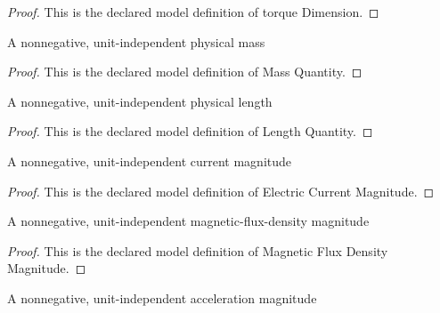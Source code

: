 \begin{proof}
  This is the declared model definition of torque Dimension.
\end{proof}
\begin{definition}
  \label{def:physics:phyx-mini-0953:phyxminiproblems-problemphyxmini0953-massquantity}
  A nonnegative, unit-independent physical mass
\end{definition}
\begin{proof}
  This is the declared model definition of Mass Quantity.
\end{proof}
\begin{definition}
  \label{def:physics:phyx-mini-0953:phyxminiproblems-problemphyxmini0953-lengthquantity}
  A nonnegative, unit-independent physical length
\end{definition}
\begin{proof}
  This is the declared model definition of Length Quantity.
\end{proof}
\begin{definition}
  \label{def:physics:phyx-mini-0953:phyxminiproblems-problemphyxmini0953-electriccurrentmagnitude}
  A nonnegative, unit-independent current magnitude
\end{definition}
\begin{proof}
  This is the declared model definition of Electric Current Magnitude.
\end{proof}
\begin{definition}
  \label{def:physics:phyx-mini-0953:phyxminiproblems-problemphyxmini0953-magneticfluxdensitymagnitude}
  A nonnegative, unit-independent magnetic-flux-density magnitude
\end{definition}
\begin{proof}
  This is the declared model definition of Magnetic Flux Density Magnitude.
\end{proof}
\begin{definition}
  \label{def:physics:phyx-mini-0953:phyxminiproblems-problemphyxmini0953-accelerationmagnitude}
  A nonnegative, unit-independent acceleration magnitude
\end{definition}
